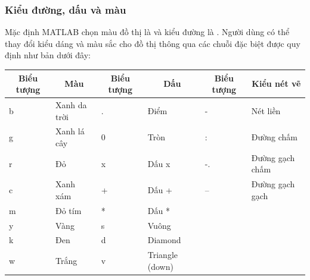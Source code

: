 \documentclass[12pt,a4paper]{article}
\begin{document}
\subsubsection{Kiểu đường, dấu và màu}
Mặc định MATLAB chọn màu đồ thị là  và kiểu đường là . Người dùng có thể thay đổi kiểu dáng và màu sắc cho đồ thị thông qua các chuỗi đặc biệt được quy định như bản dưới đây:
\begin{table}[hp]
\centering
\label{bang3}
\begin{tabular}{|ll|ll|ll|}
\hline
\multicolumn{1}{|c|}{Biểu tượng} & \multicolumn{1}{c|}{Màu} & \multicolumn{1}{c|}{Biểu tượng} & \multicolumn{1}{c|}{Dấu} & \multicolumn{1}{c|}{Biểu tượng} & \multicolumn{1}{c|}{Kiểu nét vẽ} \\ \hline
\rowcolor[HTML]{DBDBDB} 
b                                & Xanh da trời             & .                               & Điểm                     & -                               & Nét liền                         \\
g                                & Xanh lá cây              & 0                               & Tròn                     & :                               & Đường chấm                       \\
\rowcolor[HTML]{DBDBDB} 
r                                & Đỏ                       & x                               & Dấu x                    & -.                              & Đường gạch chấm                  \\
c                                & Xanh xám                 & +                               & Dấu +                    & --                              & Đường gạch gạch                  \\
\rowcolor[HTML]{DBDBDB} 
m                                & Đỏ tím                   & *                               & Dấu *                    &                                 &                                  \\
y                                & Vàng                     & s                               & Vuông                    &                                 &                                  \\
\rowcolor[HTML]{DBDBDB} 
k                                & Đen                      & d                               & Diamond                  &                                 &                                  \\
w                                & Trắng                    & v                               & Triangle (down)          &                                 &                                  \\

\end{tabular}
\end{table}
\end{document}
